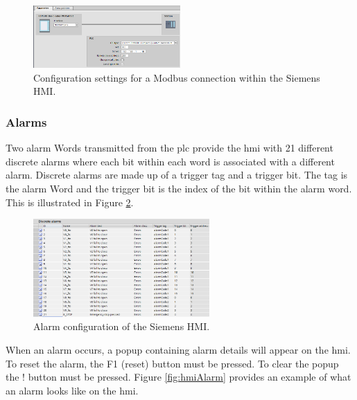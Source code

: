         \begin{figure}[H]
            \centering
            \includegraphics[width = 0.5\textwidth]{2_images/modbusHmiConfig}
            \caption{Configuration settings for a Modbus connection within the Siemens HMI.}
            \label{fig:modbusHmiConfig}
        \end{figure}        
        
        \subsubsection{Alarms}
            Two alarm Words transmitted from the \acrshort{plc} provide the \acrshort{hmi} with 21 different discrete alarms where each bit within each word is associated with a different alarm. Discrete alarms are made up of a trigger tag and a trigger bit. The tag is the alarm Word and the trigger bit is the index of the bit within the alarm word. This is illustrated in Figure \ref{fig:hmiAlarms}.

        \begin{figure}[H]
            \centering
            \includegraphics[width = 0.6\textwidth]{2_images/hmiAlarms}
            \caption{Alarm configuration of the Siemens HMI.}
            \label{fig:hmiAlarms}
        \end{figure}    

         When an alarm occurs, a popup containing alarm details will appear on the \acrshort{hmi}. To reset the alarm, the F1 (reset) button must be pressed. To clear the popup the ! button must be pressed. Figure \ref{fig:hmiAlarm} provides an example of what an alarm looks like on the \acrshort{hmi}.

